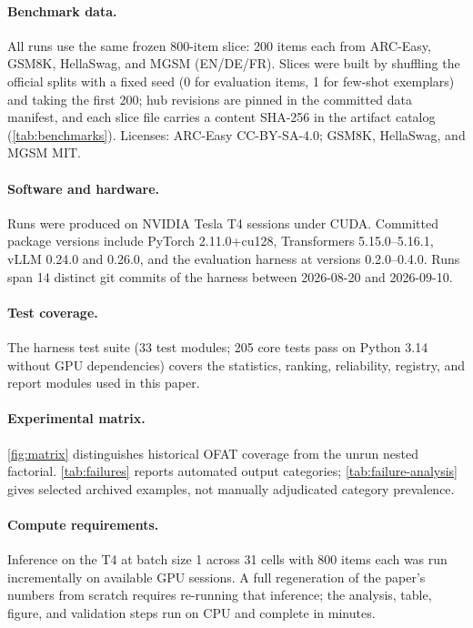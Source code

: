 \paragraph{Benchmark data.}
All runs use the same frozen 800-item slice: 200 items each from ARC-Easy, GSM8K, HellaSwag, and MGSM (EN/DE/FR). Slices were built by shuffling the official splits with a fixed seed (0 for evaluation items, 1 for few-shot exemplars) and taking the first 200; hub revisions are pinned in the committed data manifest, and each slice file carries a content SHA-256 in the artifact catalog (\cref{tab:benchmarks}). Licenses: ARC-Easy CC-BY-SA-4.0; GSM8K, HellaSwag, and MGSM MIT.

\paragraph{Software and hardware.}
Runs were produced on NVIDIA Tesla T4 sessions under CUDA. Committed package versions include PyTorch 2.11.0+cu128, Transformers 5.15.0--5.16.1, vLLM 0.24.0 and 0.26.0, and the evaluation harness at versions 0.2.0--0.4.0. Runs span 14 distinct git commits of the harness between 2026-08-20 and 2026-09-10.

\paragraph{Test coverage.}
The harness test suite (33 test modules; 205 core tests pass on Python 3.14 without GPU dependencies) covers the statistics, ranking, reliability, registry, and report modules used in this paper.

\paragraph{Experimental matrix.} \cref{fig:matrix} distinguishes historical OFAT coverage from the unrun nested factorial. \cref{tab:failures} reports automated output categories; \cref{tab:failure-analysis} gives selected archived examples, not manually adjudicated category prevalence.

\paragraph{Compute requirements.}
Inference on the T4 at batch size 1 across 31 cells with 800 items each was run incrementally on available GPU sessions. A full regeneration of the paper's numbers from scratch requires re-running that inference; the analysis, table, figure, and validation steps run on CPU and complete in minutes.